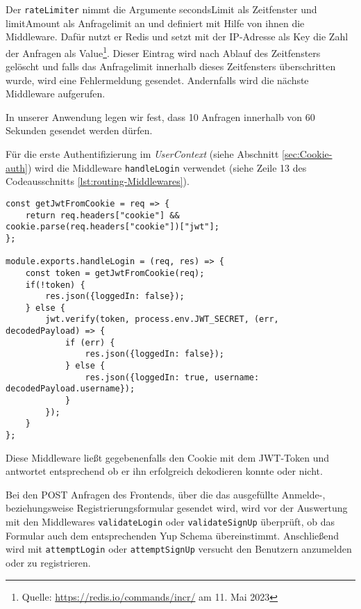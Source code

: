 Der \verb|rateLimiter| nimmt die Argumente secondsLimit als Zeitfenster und limitAmount als Anfragelimit an und definiert mit Hilfe von ihnen die Middleware. Dafür nutzt er Redis und setzt mit der IP-Adresse als Key die Zahl der Anfragen als Value\footnote{Quelle: \url{https://redis.io/commands/incr/} am 11. Mai 2023}. Dieser Eintrag wird nach Ablauf des Zeitfensters gelöscht und falls das Anfragelimit innerhalb dieses Zeitfensters überschritten wurde, wird eine Fehlermeldung gesendet. Andernfalls wird die nächste Middleware aufgerufen.

In unserer Anwendung legen wir fest, dass 10 Anfragen innerhalb von 60 Sekunden gesendet werden dürfen.

Für die erste Authentifizierung im \textit{UserContext} (siehe Abschnitt \ref{sec:Cookie-auth}) wird die Middleware \verb|handleLogin| verwendet (siehe Zeile 13 des Codeausschnitts \ref{lst:routing-Middlewares}).

\begin{lstlisting}[style=codeStyle, caption={Die handleLogin Middleware zum Authentifizieren mit Cookie}, label={lst:handleLogin}]
const getJwtFromCookie = req => {
    return req.headers["cookie"] && cookie.parse(req.headers["cookie"])["jwt"];
};

module.exports.handleLogin = (req, res) => {
    const token = getJwtFromCookie(req);
    if(!token) {
        res.json({loggedIn: false});
    } else {
        jwt.verify(token, process.env.JWT_SECRET, (err, decodedPayload) => {
            if (err) {
                res.json({loggedIn: false});
            } else {
                res.json({loggedIn: true, username: decodedPayload.username});
            }
        });
    }
};
\end{lstlisting}

Diese Middleware ließt gegebenenfalls den Cookie mit dem JWT-Token und antwortet entsprechend ob er ihn erfolgreich dekodieren konnte oder nicht.

Bei den POST Anfragen des Frontends, über die das ausgefüllte Anmelde-, beziehungsweise Registrierungsformular gesendet wird, wird vor der Auswertung mit den Middlewares \verb|validateLogin| oder \verb|validateSignUp| überprüft, ob das Formular auch dem entsprechenden Yup Schema übereinstimmt. Anschließend wird mit \verb|attemptLogin| oder \verb|attemptSignUp| versucht den Benutzern anzumelden oder zu registrieren.

